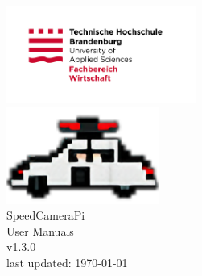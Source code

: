 \begin{titlepage}
    \begin{center}

        \vspace*{20mm}
        \includegraphics[height=120px]{texs/pre/image/2015_10_05_THB_FB-W_Logo_RGB.jpg}\\
        \includegraphics[height=120px]{texs/pre/image/speed_512_flat.png}\\
        {\normalsize SpeedCameraPi}\\[2mm]
        {\large \normalfont User Manuals\\[2mm]\small \normalfont v1.3.0}
        \\[5mm]

        {\small \normalfont last updated: \today}
        \vspace*{12mm}
        \small

    \end{center}
\end{titlepage}